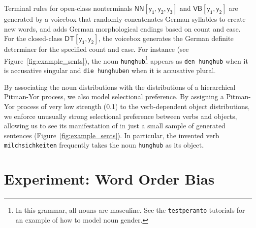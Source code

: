 \documentclass[11pt]{article}
\renewcommand{\bnfpn}[1]{\mathsf{#1}}
\renewcommand{\bnfts}[1]{\mathtt{#1}}
\begin{document}
\noindent Terminal rules for open-class nonterminals $\bnfpn{NN[y_1, y_2, y_3]}$ and $\bnfpn{VB[y_1, y_2]}$ are generated by a voicebox that randomly concatenates German syllables to create new words, and adds German morphological endings based on count and case. For the closed-class $\bnfpn{DT[y_1, y_2]}$, the voicebox generates the German definite determiner for the specified count and case. For instance (see Figure~\ref{fig:example_sents}), the noun \texttt{hunghub}\footnote{In this grammar, all nouns are masculine. See the \texttt{testperanto} tutorials for an example of how to model noun gender.} appears as \texttt{den hunghub} when it is accusative singular and \texttt{die hunghuben} when it is accusative plural.

By associating the noun distributions with the distributions of a hierarchical Pitman-Yor process, we also model selectional preference. By assigning a Pitman-Yor process of very low strength (0.1) to the verb-dependent object distributions, we enforce unusually strong selectional preference between verbs and objects, allowing us to see its manifestation of in just a small sample of generated sentences (Figure~\ref{fig:example_sents}). In particular, the invented verb \texttt{milchsichkeiten} frequently takes the noun \texttt{hunghub} as its object.


\section{Experiment: Word Order Bias}


\end{document}
